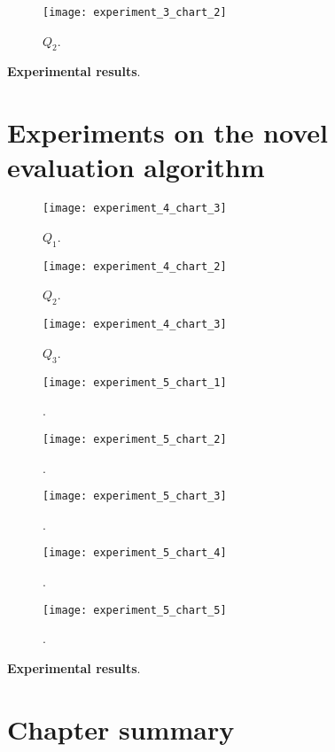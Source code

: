 \begin{figure}[H]
  \centering
  \texttt{[image: experiment\_3\_chart\_2]}
  \caption{$Q_{2}$.}
  \label{fig:???}
\end{figure}

\textbf{Experimental results}.

\section{Experiments on the novel evaluation algorithm}\label{sec:new-algorithm}

\begin{figure}[H]
  \centering
  \texttt{[image: experiment\_4\_chart\_3]}
  \caption{$Q_{1}$.}
  \label{fig:???}
\end{figure}
\begin{figure}[H]
  \centering
  \texttt{[image: experiment\_4\_chart\_2]}
  \caption{$Q_{2}$.}
  \label{fig:???}
\end{figure}
\begin{figure}[H]
  \centering
  \texttt{[image: experiment\_4\_chart\_3]}
  \caption{$Q_{3}$.}
  \label{fig:???}
\end{figure}


\begin{figure}[H]
  \centering
  \texttt{[image: experiment\_5\_chart\_1]}
  \caption{.}
  \label{fig:???}
\end{figure}

\begin{figure}[H]
  \centering
  \texttt{[image: experiment\_5\_chart\_2]}
  \caption{.}
  \label{fig:???}
\end{figure}

\begin{figure}[H]
  \centering
  \texttt{[image: experiment\_5\_chart\_3]}
  \caption{.}
  \label{fig:???}
\end{figure}

\begin{figure}[H]
  \centering
  \texttt{[image: experiment\_5\_chart\_4]}
  \caption{.}
  \label{fig:???}
\end{figure}

\begin{figure}[H]
  \centering
  \texttt{[image: experiment\_5\_chart\_5]}
  \caption{.}
  \label{fig:???}
\end{figure}

\textbf{Experimental results}.

\section{Chapter summary}

